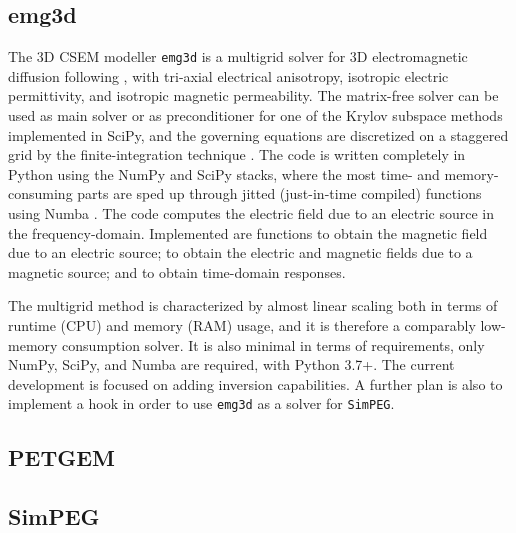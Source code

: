 \documentclass[
    paper,
  ]{geophysics}
\newcommand{\emg}[2]{\texttt{emg#1#2}\xspace}
\newcommand{\simpeg}{\texttt{SimPEG}\xspace}
\begin{document}
\subsection{emg3d}

The 3D CSEM modeller \emg3d is a multigrid \citep{CMMP.64.Fedorenko} solver for
3D electromagnetic diffusion following \cite{GP.06.Mulder}, with tri-axial
electrical anisotropy, isotropic electric permittivity, and isotropic magnetic
permeability. The matrix-free solver can be used as main solver or as
preconditioner for one of the Krylov subspace methods implemented in SciPy, and
the governing equations are discretized on a staggered grid by the
finite-integration technique \citep{AEU.77.Weiland}. The code is written
completely in Python using the NumPy and SciPy stacks, where the most time- and
memory-consuming parts are sped up through jitted (just-in-time compiled)
functions using Numba \citep{LLVM.15.Lam}. The code computes the electric field
due to an electric source in the frequency-domain. Implemented are functions to
obtain the magnetic field due to an electric source; to obtain the electric and
magnetic fields due to a magnetic source; and to obtain time-domain responses.

The multigrid method is characterized by almost linear scaling both in terms of
runtime (CPU) and memory (RAM) usage, and it is therefore a comparably
low-memory consumption solver. It is also minimal in terms of requirements,
only NumPy, SciPy, and Numba are required, with Python 3.7+. The current
development is focused on adding inversion capabilities. A further plan is also
to implement a hook in order to use \emg3d as a solver for \simpeg.

\subsection{PETGEM}


\subsection{SimPEG}
\end{document}
